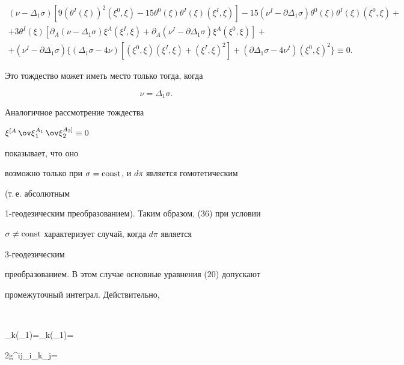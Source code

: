 \begin{multline*}


(\nu-\Delta_1\sigma)[9(\theta^I(\xi))^2(\xi^0,\xi)-


15\theta^0(\xi)\theta^I(\xi)(\xi^I,\xi)]-


15(\nu^I-\partial\Delta_1\sigma)\theta^0(\xi)


\theta^I(\xi)(\xi^0,\xi)+ \\


+3\theta^I(\xi)[\partial_A(\nu-\Delta_1\sigma)\xi^A(\xi^I,\xi)+


\partial_A(\nu^I-\partial\Delta_1\sigma)\xi^A(\xi^0,\xi)]+ \\


+(\nu^I-\partial\Delta_1\sigma)\{(\Delta_1\sigma-4\nu)


[(\xi^0,\xi)(\xi^I,\xi)+(\xi^I,\xi)^2]+


(\partial\Delta_1\sigma-4\nu^I)(\xi^0,\xi)^2\}\equiv 0.


\end{multline*}


Это тождество может иметь место только тогда, когда


\begin{equation}


\nu=\Delta_1\sigma.


\end{equation}





Аналогичное рассмотрение тождества


$\xi{}^{[A}\,\ov\xi{}^{A_1}_1\,\ov\xi{}^{A_2]}_2\equiv 0$


показывает, что оно


возможно только при $\sigma=\operatorname{const}$, и $d\pi$ является гомотетическим


(т.\,е. абсолютным


1-геодезическим преобразованием). Таким образом, (36) при условии


$\sigma\ne\operatorname{const}$ характеризует случай, когда $d\pi$ является


3-геодезическим


преобразованием. В этом случае основные уравнения (20) допускают


промежуточный интеграл. Действительно,


$$


\partial_k(\Delta_1\sigma)=\nabla_k(\Delta_1\sigma)=


2g^{ij}\sigma_i\nabla_k\sigma_j=


